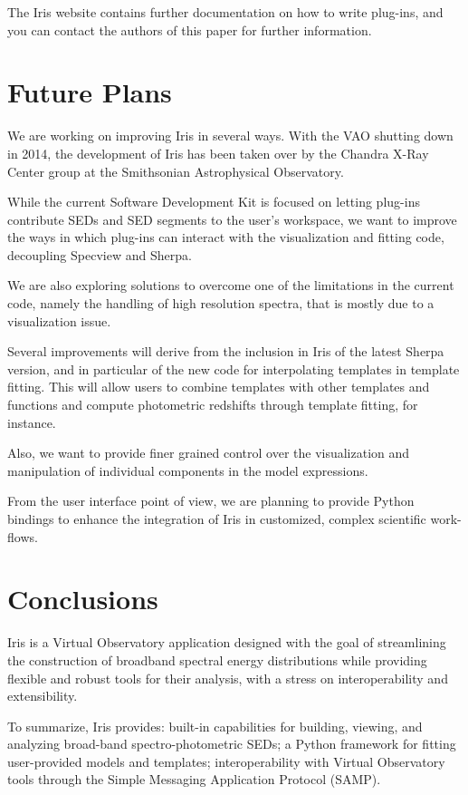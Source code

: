 \documentclass[preprint,authoryear,5p]{elsarticle}
\begin{document}
The Iris website contains further documentation on how to write plug-ins, and
you can contact the authors of this paper for further information.

\section{Future Plans} We are working on improving Iris in several ways. With
the VAO shutting down in 2014, the development of Iris has been taken over by
the Chandra X-Ray Center group at the Smithsonian Astrophysical Observatory.

While the current Software Development Kit is focused on letting plug-ins
contribute SEDs and SED segments to the user's workspace, we want to improve the
ways in which plug-ins can interact with the visualization and fitting code,
decoupling Specview and Sherpa.

We are also exploring solutions to overcome one of the limitations in the
current code, namely the handling of high resolution spectra, that is mostly due
to a visualization issue.

Several improvements will derive from the inclusion in Iris of the latest Sherpa
version, and in particular of the new code for interpolating templates in
template fitting. This will allow users to combine templates with other
templates and functions and compute photometric redshifts through template
fitting, for instance.

Also, we want to provide finer grained control over the visualization and
manipulation of individual components in the model expressions.

From the user interface point of view, we are planning to provide Python
bindings to enhance the integration of Iris in customized, complex scientific
work-flows.

\section{Conclusions} \label{sec:conclusions}

Iris is a Virtual Observatory application designed with the goal of streamlining
the construction of broadband spectral energy distributions while providing
flexible and robust tools for their analysis, with a stress on interoperability
and extensibility.

To summarize, Iris provides: built-in capabilities for building, viewing, and
analyzing broad-band spec\-tro-pho\-to\-met\-ric SEDs; a Python framework for fitting
user-pro\-vid\-ed models and templates; interoperability with Virtual Observatory
tools through the Simple Messaging Application Protocol (SAMP).
\end{document}
